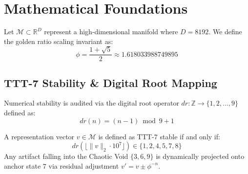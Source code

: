 \section{Mathematical Foundations}
Let $\mathcal{M} \subset \mathbb{R}^D$ represent a high-dimensional manifold where $D = 8192$. We define the golden ratio scaling invariant as:
\begin{equation}
    \phi = \frac{1 + \sqrt{5}}{2} \approx 1.618033988749895
\end{equation}

\subsection{TTT-7 Stability & Digital Root Mapping}
Numerical stability is audited via the digital root operator $dr: \mathbb{Z} \to \{1, 2, \dots, 9\}$ defined as:
\begin{equation}
    dr(n) = (n - 1) \bmod 9 + 1
\end{equation}

A representation vector $v \in \mathcal{M}$ is defined as TTT-7 stable if and only if:
\begin{equation}
    dr(\lfloor \|v\|_2 \cdot 10^7 \rfloor) \in \{1, 2, 4, 5, 7, 8\}
\end{equation}
Any artifact falling into the Chaotic Void $\{3, 6, 9\}$ is dynamically projected onto anchor state $7$ via residual adjustment $v' = v \pm \phi^{-n}$.